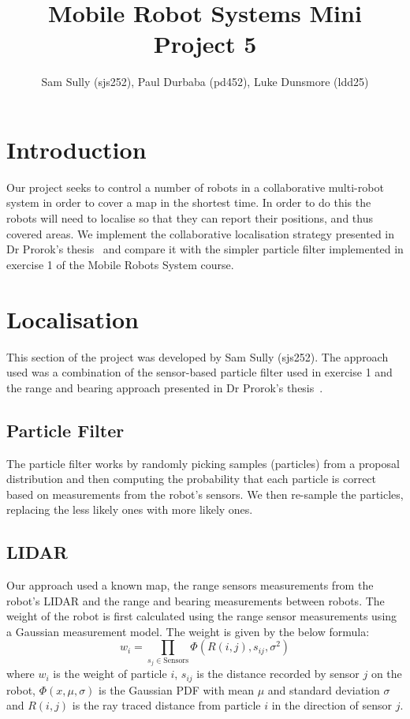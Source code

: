 \documentclass[a4paper, 10pt, conference]{ieeeconf}      %
\title{\LARGE \bf
Mobile Robot Systems Mini Project 5
}
\author{Sam Sully (sjs252), Paul Durbaba (pd452), Luke Dunsmore (ldd25)}
\begin{document}
\maketitle

\section{Introduction}
Our project seeks to control a number of robots in a collaborative multi-robot system in order to cover a map in the shortest time. In order to do this the robots will need to localise so that they can report their positions, and thus covered areas. We implement the collaborative localisation strategy presented in Dr Prorok's thesis~\cite{prorok} and compare it with the simpler particle filter implemented in exercise 1 of the Mobile Robots System course.
\section{Localisation}
This section of the project was developed by Sam Sully (sjs252). The approach used was a combination of the sensor-based particle filter used in exercise 1 and the range and bearing approach presented in Dr Prorok's thesis~\cite{prorok}.
\subsection{Particle Filter}
The particle filter works by randomly picking samples (particles) from a proposal distribution and then computing the probability that each particle is correct based on measurements from the robot's sensors. We then re-sample the particles, replacing the less likely ones with more likely ones.
\subsection{LIDAR}
Our approach used a known map, the range sensors measurements from the robot's LIDAR and the range and bearing measurements between robots. The weight of the robot is first calculated using the range sensor measurements using a Gaussian measurement model. The weight is given by the below formula:
\[
	w_i = \prod_{s_{j} \in \mathrm{Sensors}}\Phi(R(i,j), s_{ij}, \sigma^2)
\]
where $w_i$ is the weight of particle $i$, $s_{ij}$ is the distance recorded by sensor $j$ on the robot, $\Phi(x,\mu,\sigma)$ is the Gaussian PDF with mean $\mu$ and standard deviation $\sigma$ and $R(i,j)$ is the ray traced distance from particle $i$ in the direction of sensor $j$.
\end{document}
